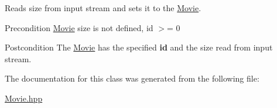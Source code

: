 Reads size from input stream and sets it to the \hyperlink{class_movie}{Movie}. 

\begin{DoxyPrecond}{Precondition}
\hyperlink{class_movie}{Movie} size is not defined, id $>$= 0 
\end{DoxyPrecond}
\begin{DoxyPostcond}{Postcondition}
The \hyperlink{class_movie}{Movie} has the specified {\bfseries id} and the size read from input stream. 
\end{DoxyPostcond}


The documentation for this class was generated from the following file\-:\begin{DoxyCompactItemize}
\item 
\hyperlink{_movie_8hpp}{Movie.\-hpp}\end{DoxyCompactItemize}
